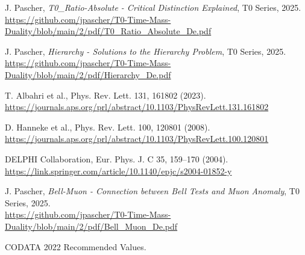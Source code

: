 \documentclass[12pt,a4paper]{article}
\begin{document}
\begin{thebibliography}{99}
		 J. Pascher, \textit{T0\_Ratio-Absolute - Critical Distinction Explained}, T0 Series, 2025. \\
		\url{https://github.com/jpascher/T0-Time-Mass-Duality/blob/main/2/pdf/T0_Ratio_Absolute_De.pdf}
		
		 J. Pascher, \textit{Hierarchy - Solutions to the Hierarchy Problem}, T0 Series, 2025. \\
		\url{https://github.com/jpascher/T0-Time-Mass-Duality/blob/main/2/pdf/Hierarchy_De.pdf}
		
		 T. Albahri et al., Phys. Rev. Lett. 131, 161802 (2023). \\
		\url{https://journals.aps.org/prl/abstract/10.1103/PhysRevLett.131.161802}
		
		 D. Hanneke et al., Phys. Rev. Lett. 100, 120801 (2008). \\
		\url{https://journals.aps.org/prl/abstract/10.1103/PhysRevLett.100.120801}
		
		 DELPHI Collaboration, Eur. Phys. J. C 35, 159--170 (2004). \\
		\url{https://link.springer.com/article/10.1140/epjc/s2004-01852-y}
		
		 J. Pascher, \textit{Bell-Muon - Connection between Bell Tests and Muon Anomaly}, T0 Series, 2025. \\
		\url{https://github.com/jpascher/T0-Time-Mass-Duality/blob/main/2/pdf/Bell_Muon_De.pdf}
		
		 CODATA 2022 Recommended Values.
	\end{thebibliography}
	
\end{document}

